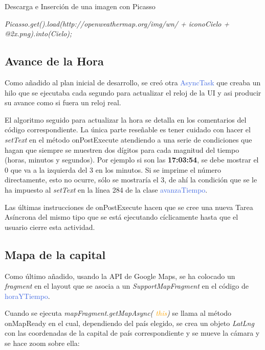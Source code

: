 \documentclass[letterpaper,twocolumn,openany,nodeprecatedcode,dvipsnames,nomultitoc]{dndbook}
\begin{document}
\begin{justify}
\begin{DndSidebar}{Descarga e Inserción de una imagen con Picasso}
\par \textit{ Picasso.get().load(\textcolor{OliveGreen}{http://openweathermap.org/img/wn/} + iconoCielo + \textcolor{OliveGreen}{@2x.png}).into(Cielo);}
\end{DndSidebar}

\subsection{Avance de la Hora}
Como añadido al plan inicial de desarrollo, se creó otra \textcolor{RoyalBlue}{AsyncTask} que creaba un hilo que se ejecutaba cada segundo para actualizar el reloj de la UI y asi producir su avance como si fuera un reloj real.
\vspace{3pt}

El algoritmo seguido para actualizar la hora se detalla en los comentarios del código correspondiente. La única parte reseñable es tener cuidado con hacer el \textit{setText} en el método \textcolor{BurntOrange}{onPostExecute} atendiendo a una serie de condiciones que hagan que siempre se muestren dos dígitos para cada magnitud del tiempo (horas, minutos y segundos). Por ejemplo si son las \textbf{17:03:54}, se debe mostrar el 0 que va a la izquierda del 3 en los minutos. Si se imprime el número directamente, esto no ocurre, sólo se mostraría el 3, de ahí la condición que se le ha impuesto al \textit{setText} en la línea 284 de la clase \textcolor{RoyalBlue}{avanzaTiempo}.
\vspace{3pt}

Las últimas instrucciones de \textcolor{BurntOrange}{onPostExecute} hacen que se cree una nueva Tarea Asíncrona del mismo tipo que se está ejecutando cíclicamente hasta que el usuario cierre esta actividad.

\subsection{Mapa de la capital}
Como último añadido, usando la API de Google Maps, se ha colocado un \textit{fragment} en el layout que se asocia a un \textit{SupportMapFragment} en el código de \textcolor{RoyalBlue}{horaYTiempo}. 

\vspace{3pt}
Cuando se ejecuta \textit{mapFragment.getMapAsync( \textcolor{orange}{this})} se llama al método \textcolor{BurntOrange}{onMapReady} en el cual, dependiendo del país elegido, se crea un objeto \textit{LatLng} con las coordenadas de la capital de país correspondiente y se mueve la cámara y se hace zoom sobre ella:


\end{justify}
\end{document}
